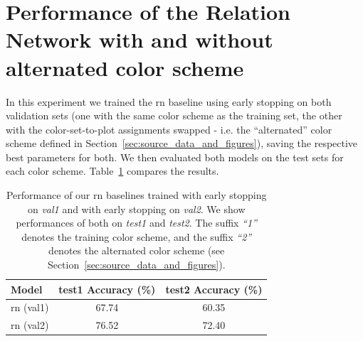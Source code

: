\documentclass{article} %
\def\bestrntestone{76.52} %
\def\bestrntesttwo{72.40} %
\def\bestrnonetestone{67.74} %
\def\bestrnonetesttwo{60.35} %
\begin{document}
\section{Performance of the Relation Network with and without alternated color scheme}
\label{sec:early_stop}
In this experiment we trained the \gls{rn} baseline using early stopping on both validation sets (one with the same color scheme as the training set, the other with the color-set-to-plot assignments swapped - i.e. the ``alternated'' color scheme defined in Section~\ref{sec:source_data_and_figures}), saving the respective best parameters for both. We then evaluated both models on the test sets for each color scheme. Table~\ref{tab:acc_early_stop} compares the results.
\begin{table}[h]
    \caption{Performance of our \gls{rn} baselines trained with early stopping on \emph{val1} and with early stopping on \emph{val2}. We show performances of both on \emph{test1} and \emph{test2}. The suffix \emph{``1''} denotes the training color scheme, and the suffix \emph{``2''} denotes the alternated color scheme (see Section~\ref{sec:source_data_and_figures}).}
    \label{tab:acc_early_stop}
    \begin{center}
        \begin{tabular}{lcc}
            \toprule
            Model & test1 Accuracy  (\%) & test2 Accuracy  (\%) \\
            \midrule
            \gls{rn} (val1) & \bestrnonetestone & \bestrnonetesttwo \\ %
            \gls{rn} (val2) & \bestrntestone & \bestrntesttwo \\ %
            \bottomrule
        \end{tabular}
    \end{center}
\end{table}
\end{document}
